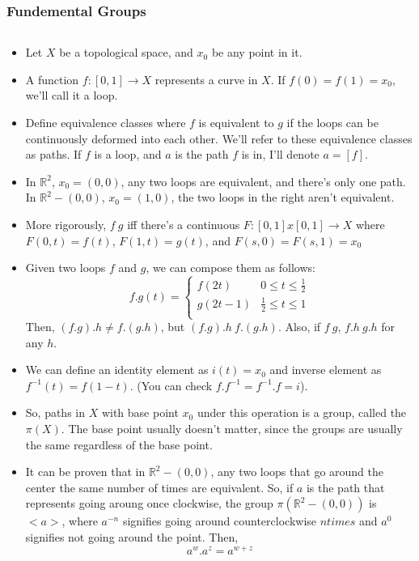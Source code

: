 \documentclass[8pt]{beamer}
\begin{document}
  \begin{frame}
    \frametitle{Fundemental Groups}
    \begin{columns}
      \begin{column}[T]{0.5\textwidth}
        \begin{itemize}
          \item Let $X$ be a topological space, and $x_0$ be any point in it.

          \item A function $f:[0,1] \rightarrow X$ represents a curve in $X$.
            If $f(0) = f(1) = x_0$, we'll call it a loop.

          \item Define equivalence classes where $f$ is equivalent to $g$ if
            the loops can be continuously deformed into each other. We'll refer
            to these equivalence classes as paths. If $f$ is a loop, and $a$ is
            the path $f$ is in, I'll denote $a = [f]$.
          \item In $\mathbb{R}^2$, $x_0 = (0,0)$, any two loops are equivalent,
            and there's only one path.
            In $\mathbb{R}^2 - (0,0)$, $x_0 = (1,0)$, the two loops in the right
            aren't equivalent.
          \item More rigorously, $f ~ g$ iff there's a continuous $F: [0,1]x
            [0,1] \rightarrow X$ where $F(0,t) = f(t)$, $F(1,t) = g(t)$, and
            $F(s,0) = F(s,1) = x_0$
          \item Given two loops $f$ and $g$, we can compose them as follows:
            \[f . g (t) = \begin{cases} f(2t) & 0 \leq t \leq \frac{1}{2} \\
                                        g(2t-1) & \frac{1}{2} \leq t \leq 1 \\
            \end{cases}\]
            Then, $(f.g).h \neq f.(g.h)$, but $(f.g).h ~ f.(g.h)$. Also, if
            $f ~ g$, $f . h ~ g . h$ for any  $h$.
          \item We can define an identity element as $i(t) = x_0$ and inverse
            element as $f^{-1}(t) = f(1-t)$. (You can check $f.f^{-1} =
            f^{-1}.f = i$).
          \item So, paths in $X$ with base point $x_0$ under this operation is a
            group, called the $\pi(X)$. The base point usually doesn't matter,
            since the groups are usually the same regardless of the base point.
          \item It can be proven that in $\mathbb{R}^2 - (0,0)$, any two loops
            that go around the center the same number of times are equivalent.
            So, if $a$ is the path that represents going aroung once clockwise,
            the group $\pi(\mathbb{R}^2 - (0,0))$ is $<a>$, where $a^{-n}$
            signifies going around counterclockwise $n times$ and $a^0$
            signifies not going around the point. Then,
            \[a^w . a^z = a^{w+z}\]
        \end{itemize}
      \end{column}
    \end{columns}
  \end{frame}
\end{document}
